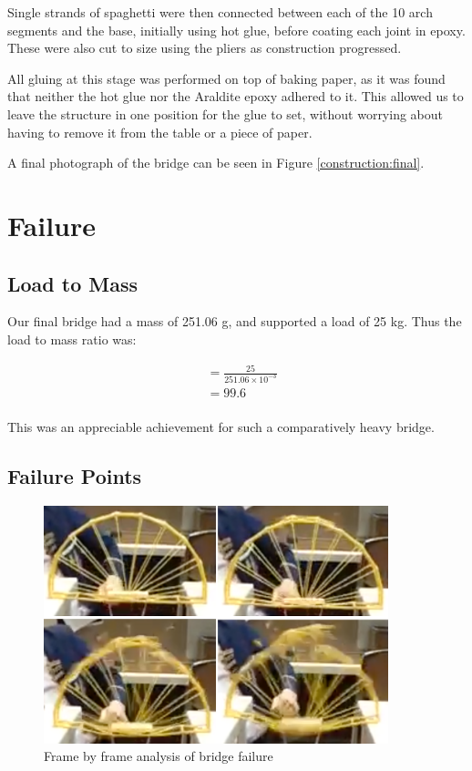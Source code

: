 \documentclass[a4paper,11pt]{article}
\begin{document}
Single strands of spaghetti were then connected between each of the 10 arch
segments and the base, initially using hot glue, before coating each joint in
epoxy.
These were also cut to size using the pliers as construction progressed.

All gluing at this stage was performed on top of baking paper, as it was found
that neither the hot glue nor the Araldite epoxy adhered to it.
This allowed us to leave the structure in one position for the glue to set,
without worrying about having to remove it from the table or a piece of paper.

A final photograph of the bridge can be seen in Figure \ref{construction:final}.




\section{Failure}

\subsection{Load to Mass}

Our final bridge had a mass of 251.06 g, and supported a load of 25 kg.
Thus the load to mass ratio was:

$$
\begin{aligned}
& = \frac{25}{251.06 \times 10^{-3}} \\
& = 99.6 \\
\end{aligned}
$$

This was an appreciable achievement for such a comparatively heavy bridge.


\subsection{Failure Points}

\begin{figure}
\begin{center}
\includegraphics[width=10cm]{figures/frames.png}
\end{center}
\caption{Frame by frame analysis of bridge failure}
\label{failure:frames}
\end{figure}
\end{document}

